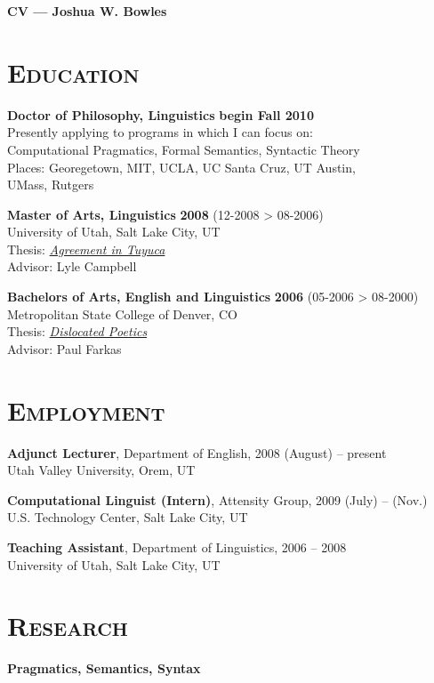 \documentclass{resume}
\begin{document}
 
{\sc \Large {\bf CV --- Joshua W. Bowles}}
\begin{resume}

\section{\textsc{Education}}
{\bf Doctor of Philosophy, Linguistics} \hfill {\bf begin Fall 2010} \\ 
Presently applying to programs in which I can focus on:\\ Computational Pragmatics, Formal Semantics, Syntactic Theory\\ Places: Georegetown, MIT, UCLA, UC Santa Cruz, UT Austin,\\ UMass, Rutgers  

{\bf Master of Arts, Linguistics} \hfill {\bf 2008} (12-2008 \textgreater{} 08-2006) \\ 
University of Utah, Salt Lake City, UT\\ Thesis: \href{http://sites.google.com/site/bowleslinguistics/Home/research}{\emph{Agreement in Tuyuca}}\\ Advisor: Lyle Campbell 

{\bf Bachelors of Arts, English and Linguistics} \hfill {\bf 2006} (05-2006 \textgreater{} 08-2000) \\ Metropolitan State College of Denver, CO\\ Thesis: \href{http://sites.google.com/site/bowleslinguistics/Home/research/misc-1/symmetry-1/literature}{\emph{Dislocated Poetics}}\\ Advisor: Paul Farkas 
 

\section{\textsc{Employment}}
 {\bf Adjunct Lecturer}, Department of English, \hfill 2008 (August) -- present\\
    Utah Valley University, Orem, UT 		

{\bf Computational Linguist (Intern)}, Attensity Group, \hfill 2009 (July) -- (Nov.)\\
		U.S. Technology Center, Salt Lake City, UT  
		 
   
 
    {\bf Teaching Assistant}, Department of Linguistics, \hfill 2006 -- 2008\\ 
    University of Utah, Salt Lake City, UT 
 
\section{\textsc{Research}} 
{\bf Pragmatics, Semantics, Syntax}


\end{resume}
\end{document}

